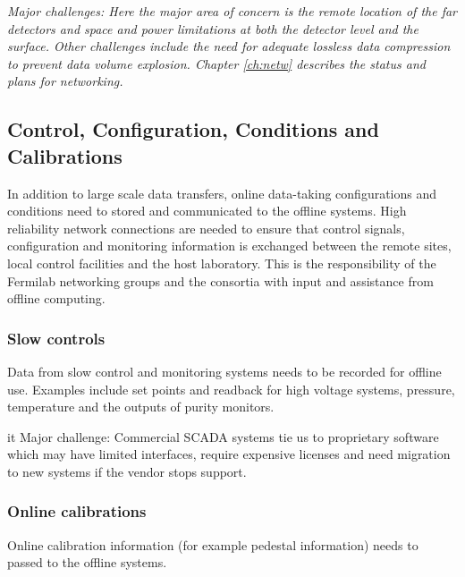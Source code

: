 \documentclass[../main-v1.tex]{subfiles}
\begin{document}
{\it Major challenges: Here the major area of concern is the remote location of the far detectors and space and power limitations at both the detector level and the surface. Other challenges include  the need for adequate lossless data compression to prevent data volume explosion. Chapter \ref{ch:netw} describes the status and plans for networking.}

\subsection{Control, Configuration, Conditions and Calibrations}
In addition to large scale data transfers, online data-taking configurations and conditions need to stored and communicated to the offline systems. High reliability network connections are needed to ensure that control signals, configuration and monitoring information is exchanged between the remote sites, local control facilities and the host laboratory.
This is the responsibility of the Fermilab networking groups and the  consortia with input and assistance from offline computing. 


\subsubsection{Slow controls}
Data from slow control and monitoring systems needs to be recorded for offline use.  Examples include set points and readback for high voltage systems, pressure, temperature and the outputs of purity monitors. 

{it Major challenge: Commercial SCADA systems tie us to proprietary software which may have limited interfaces, require expensive licenses and need migration to new systems if the vendor stops support.}

\subsubsection{Online calibrations}
Online calibration information (for example pedestal information) needs to passed to the offline systems. 

\end{document}
